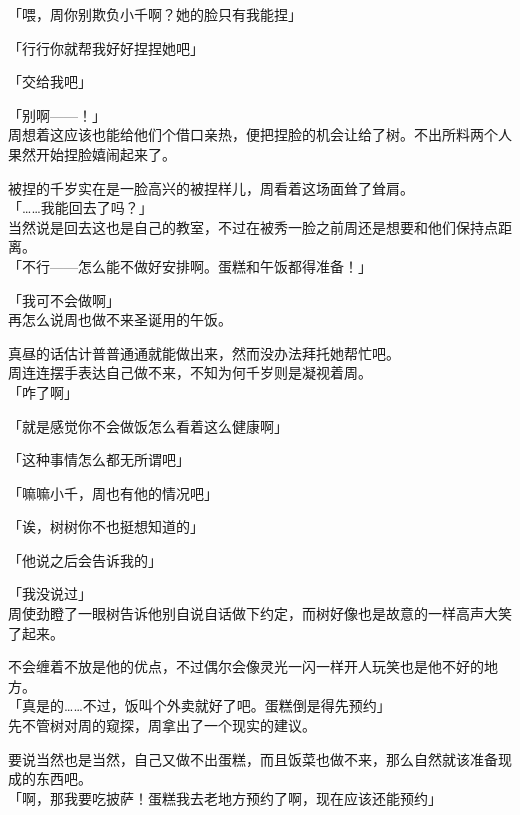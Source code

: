 「喂，周你别欺负小千啊？她的脸只有我能捏」

「行行你就帮我好好捏捏她吧」

「交给我吧」

「别啊——！」\\

周想着这应该也能给他们个借口亲热，便把捏脸的机会让给了树。不出所料两个人果然开始捏脸嬉闹起来了。

被捏的千岁实在是一脸高兴的被捏样儿，周看着这场面耸了耸肩。\\

「……我能回去了吗？」\\

当然说是回去这也是自己的教室，不过在被秀一脸之前周还是想要和他们保持点距离。\\

「不行——怎么能不做好安排啊。蛋糕和午饭都得准备！」

「我可不会做啊」\\

再怎么说周也做不来圣诞用的午饭。

真昼的话估计普普通通就能做出来，然而没办法拜托她帮忙吧。\\

周连连摆手表达自己做不来，不知为何千岁则是凝视着周。\\

「咋了啊」

「就是感觉你不会做饭怎么看着这么健康啊」

「这种事情怎么都无所谓吧」

「嘛嘛小千，周也有他的情况吧」

「诶，树树你不也挺想知道的」

「他说之后会告诉我的」

「我没说过」\\

周使劲瞪了一眼树告诉他别自说自话做下约定，而树好像也是故意的一样高声大笑了起来。

不会缠着不放是他的优点，不过偶尔会像灵光一闪一样开人玩笑也是他不好的地方。\\

「真是的……不过，饭叫个外卖就好了吧。蛋糕倒是得先预约」\\

先不管树对周的窥探，周拿出了一个现实的建议。

要说当然也是当然，自己又做不出蛋糕，而且饭菜也做不来，那么自然就该准备现成的东西吧。\\

「啊，那我要吃披萨！蛋糕我去老地方预约了啊，现在应该还能预约」

